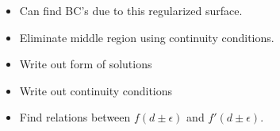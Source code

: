 \begin{itemize}
  \item {Can find BC's due to this regularized surface.}
  \item Eliminate middle region using continuity conditions.  
  \item Write out form of solutions
  \item Write out continuity conditions
  \item Find relations between $f(d\pm \epsilon)$ and $f'(d\pm \epsilon)$.

\end{itemize}
